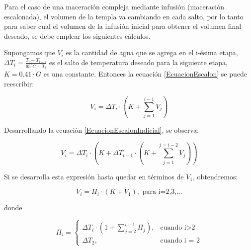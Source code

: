 \begin{itemize}
                \par Para el caso de una maceración compleja mediante infusión (maceración escalonada), el volumen de la templa va cambiando en cada salto, por lo tanto para saber cual el volumen de la infusión inicial para obtener el volumen final deseado, se debe emplear los siguientes cálculos.
                
                \par Supongamos que $V_i$ es la cantidad de agua que se agrega en el i-ésima etapa, $\Delta T_{i} = \frac{T_i - T_{i-1}}{95^{\circ}C - T_i}$ es el salto de temperatura deseado para la siguiente etapa,  $K=0.41 \cdot G$ es una constante. Entonces la ecuación \ref{EcuacionEscalon} se puede reescribir:
                
                \begin{equation}
                    V_{i} = \Delta T_{i} \cdot (K + \sum_{j=1}^{i-1} V_j )
                    \label{EcuacionEscalonIndicial}
                \end{equation}
                
                \par Desarrollando la ecuación \ref{EcuacionEscalonIndicial}, se observa:
                
                \begin{equation}
                    V_{i} = \Delta T_{i} \cdot (K + \Delta T_{i-1} \cdot (K + \sum_{j=1}^{j = i-2} V_j))
                \end{equation}
                
                \par Si se desarrolla esta expresión hasta quedar en términos de $V_1$, obtendremos:
                
                \begin{equation}
                    V_i = \Pi_i \cdot(K + V_1), \text{ para i=2,3,...}
                \label{EcuacionEscalonadaPi}
                \end{equation}
                \par donde
                
                $$ \Pi_i = 
                \begin{cases}
                \Delta T_i \cdot (1 + \sum_{j=2}^{i-1} \Pi_j), & \text{cuando i>2} \\
                \Delta T_2, & \text{cuando i = 2}
                \end{cases}
                $$
                

\end{itemize}
